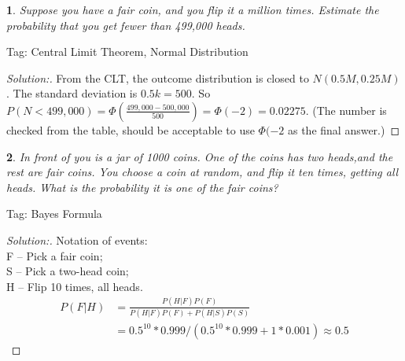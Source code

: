 \documentclass[10pt]{report}
\newtheorem{exe}{}[chapter]
\newenvironment{sol}{\begin{proof}[Solution:]}{\end{proof}}
\begin{document}
\begin{exe}
Suppose you have a fair coin, and you flip it a million times. Estimate the probability that you get fewer than 499,000 heads.
\end{exe}
\begin{teacher}
Tag: Central Limit Theorem, Normal Distribution
\begin{sol}
From the CLT, the outcome distribution is closed to $N(0.5M, 0.25M)$. The standard deviation is $0.5k=500$. So $P(N<499,000) = \Phi(\frac{499,000 - 500, 000}{500}) = \Phi(-2) = 0.02275$. (The number is checked from the table, should be acceptable to use $\Phi(-2$ as the final answer.)
\end{sol}
\end{teacher}

\begin{exe}
In front of you is a jar of 1000 coins. One of the coins has two heads,and the rest are fair coins. You choose a coin at random, and flip it ten times, getting all heads. What is the probability it is one of the fair coins?
\end{exe}
\begin{teacher}
Tag: Bayes Formula
\begin{sol} 
Notation of events:\\
F -- Pick a fair coin;\\
S -- Pick a two-head coin;\\
H -- Flip 10 times, all heads.\\
\begin{equation*}
\begin{split}
    P(F|H) &= \frac{P(H|F)P(F)}{P(H|F)P(F) + P(H|S)P(S)}\\
    & = 0.5^{10}*0.999/(0.5^{10}*0.999+1*0.001) \approx 0.5
\end{split}
\end{equation*}
\end{sol}
\end{teacher}
\end{document}
